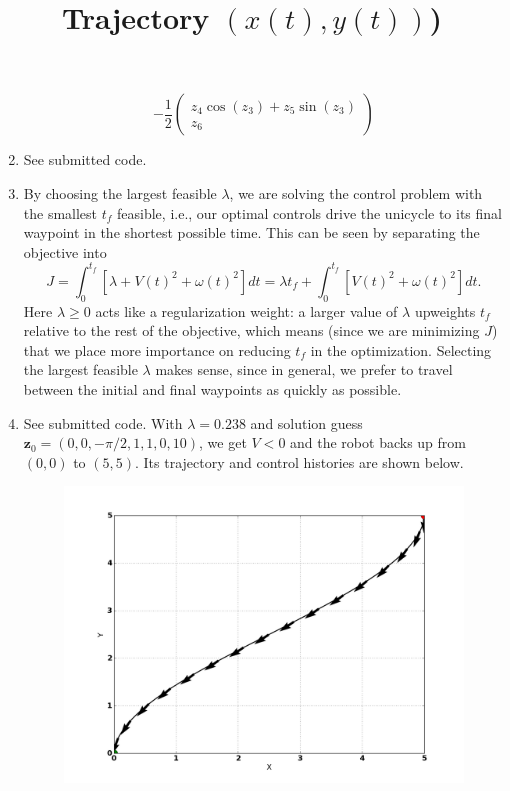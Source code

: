 \documentclass[12pt]{article}
\begin{document}
\begin{enumerate}
\begin{equation}
		-\frac{1}{2}\left(\begin{array}{c}
		z_4\cos(z_3) + z_5\sin(z_3) \\
		z_6
		\end{array}\right)
	\end{equation}
	\item See submitted code.
	\item By choosing the largest feasible $\lambda$, we are solving the control problem with the smallest $t_f$ feasible, i.e., our optimal controls drive the unicycle to its final waypoint in the shortest possible time. This can be seen by separating the objective into
	\[
		J = \int_0^{t_f} [\lambda + V(t)^2 + \omega(t)^2]dt = \lambda t_f + \int_0^{t_f} [V(t)^2 + \omega(t)^2]dt.
	\]
	Here $\lambda \geq 0$ acts like a regularization weight: a larger value of $\lambda$ upweights $t_f$ relative to the rest of the objective, which means (since we are minimizing $J$) that we place more importance on reducing $t_f$ in the optimization. Selecting the largest feasible $\lambda$ makes sense, since in general, we prefer to travel between the initial and final waypoints as quickly as possible.
	\item See submitted code. With $\lambda = 0.238$ and solution guess $\mathbf{z}_0 = (0, 0, -\pi/2, 1, 1, 0, 10)$, we get $V < 0$ and the robot backs up from $(0,0)$ to $(5,5)$. Its trajectory and control histories are shown below.
	\begin{figure}[H]
		\centering
		\title{\bf Trajectory $(x(t), y(t))$)}
		\includegraphics[width=\textwidth]{../Figures/hw1_1_iv_a.png}
	\end{figure}
	\begin{figure}[H]

\end{figure}
\end{enumerate}
\end{document}
